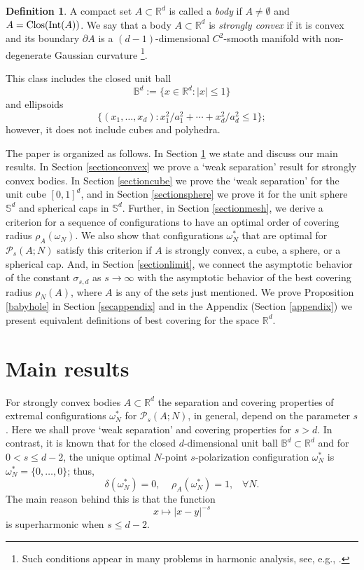 \documentclass[12pt]{amsart}
\theoremstyle{definition}
\newtheorem{defin}[theorem]{Definition}
\def\R{\mathbb{R}}
\newcommand{\1}{\mathbf{1}}
\newcommand{\PP}{\mathcal{P}}
\renewcommand\S{\mathbb{S}}
\begin{document}
\begin{defin}\label{strconv}
A compact set $A\subset \R^d$ is called a {\it body} if $A\not=\emptyset$ and $A=\textup{Clos}(\textup{Int}(A))$. We say that a body $A\subset \R^d$ is {\it strongly convex} if it is convex and its boundary $\partial A$ is a $(d-1)$-dimensional $C^2$-smooth manifold with non-degenerate Gaussian curvature \footnote{Such conditions appear in many problems in harmonic analysis, see, e.g., \cite{Iosevich20010}.}.
\end{defin}
This class includes the closed unit ball 
$$
\mathbb{B}^d:=\{x\in \R^d\colon |x|\leqslant 1\}$$ 
and ellipsoids 
$$
\{(x_1, \ldots, x_d)\colon x_1^2/a_1^2 + \cdots + x_d^2/a_d^2 \leqslant 1\};$$ 
however, it does not include cubes and polyhedra. 





The paper is organized as follows. In Section \ref{sectionmain} we state and discuss our main results. In Section \ref{sectionconvex} we prove a `weak separation' result for strongly convex bodies. In Section \ref{sectioncube} we prove the `weak separation' for the unit cube $[0,1]^d$, and in Section \ref{sectionsphere} we prove it for the unit sphere $\S^d$ and spherical caps in $\S^d$. Further, in Section \ref{sectionmesh}, we derive a criterion for a sequence of configurations to have an optimal order of covering radius $\rho_A(\omega_N)$. We also show that configurations $\omega^*_N$ that are optimal for $\PP_s(A; N)$ satisfy this criterion if $A$ is strongly convex, a cube, a sphere, or a spherical cap. And, in Section \ref{sectionlimit}, we connect the asymptotic behavior of the constant $\sigma_{s,d}$ as $s\to \infty$ with the asymptotic behavior of the best covering radius $\rho_N(A)$, where $A$ is any of the sets just mentioned.
We prove Proposition \ref{babyhole} in Section \ref{secappendix} and in the Appendix (Section \ref{appendix}) we present equivalent definitions of best covering for the space $\R^d$.
\section{Main results}\label{sectionmain}
For strongly convex bodies $A\subset \R^d$ the separation and covering properties of extremal configurations $\omega_N^*$ for $\PP_s(A; N)$, in general, depend on the parameter $s$. Here we shall prove `weak separation' and covering properties for $s>d$.
In contrast, it is known \cite{Erdelyi2013} that for the closed $d$-dimensional unit ball $\mathbb{B}^d\subset \R^d$ and for $0<s\leqslant d-2$, the unique optimal $N$-point $s$-polarization configuration $\omega^*_N$ is $\omega^*_N = \{0, \ldots, 0\}$; thus,
$$
\delta(\omega^*_N)=0, \;\;\;\; \rho_{A}(\omega^*_N) = 1, \; \; \; \forall N. 
$$
The main reason behind this is that the function
$$
x\mapsto |x-y|^{-s}
$$
is superharmonic when $s\leqslant d-2$. 
\end{document}
